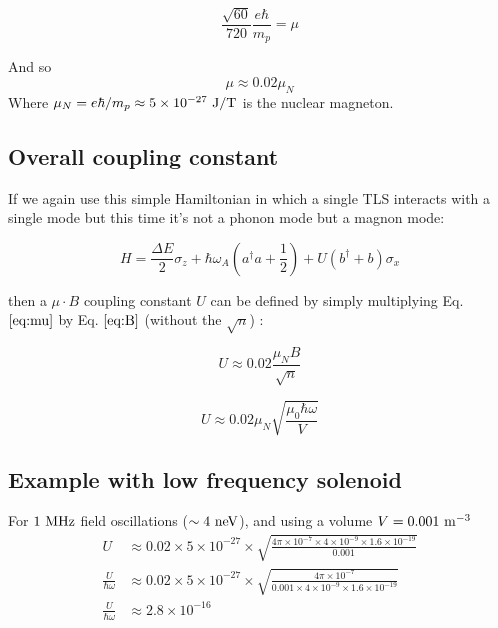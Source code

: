 \documentclass[
]{article}
\renewcommand{\[}{\begin{equation}}
\renewcommand{\]}{\end{equation}}
\begin{document}
\[
\frac{\sqrt{60}}{720} \frac{e\hbar}{m_p} = \mu
\]

And so \[
\mu \approx 0.02 \mu_N
\label{eq:mu}
\] Where \(\mu_N = e\hbar/m_p \approx 5\times 10^{-27} \ \rm J/T\) is
the nuclear magneton.

\subsection{Overall coupling
constant}\label{overall-coupling-constant-2}

If we again use this simple Hamiltonian in which a single TLS interacts
with a single mode but this time it's not a phonon mode but a magnon
mode:

\[
H = \frac{\Delta E}{2} \sigma_z + \hbar\omega_A\left(a^{\dagger}a +\frac{1}{2}\right) + U\left( b^{\dagger} + b \right)\sigma_x
\]

then a \(\mu \cdot B\) coupling constant \(U\) can be defined by simply
multiplying Eq. \(\ref{eq:mu}\) by Eq. \(\ref{eq:B}\) (without the
\(\sqrt{n}\)) :

\[
U \approx 0.02 \frac{{\mu_N}B}{\sqrt{n}}
\]

\[
U \approx 0.02 {\mu_N}\sqrt{\frac{\mu_0\hbar\omega}{V}}
\]

\subsection{Example with low frequency
solenoid}\label{example-with-low-frequency-solenoid}

For \(1 \ \rm MHz\) field oscillations (\(\sim 4 \ \rm neV\)), and using
a volume \(V = 0.001 \ \rm m^{-3}\) \[
\begin{aligned}
U &\approx 0.02 \times 5\times 10^{-27}\times \sqrt{\frac{4\pi\times 10^{-7}\times 4\times 10^{-9}\times 1.6\times 10^{-19}}{0.001}} \\
\frac{U}{\hbar\omega} &\approx 0.02 \times 5\times 10^{-27}\times\sqrt{\frac{4\pi\times 10^{-7} }{0.001 \times 4\times 10^{-9}\times 1.6\times 10^{-19}}} \\
\frac{U}{\hbar\omega} &\approx 2.8\times10^{-16}
\end{aligned}
\]

\printbibliography
\end{document}
